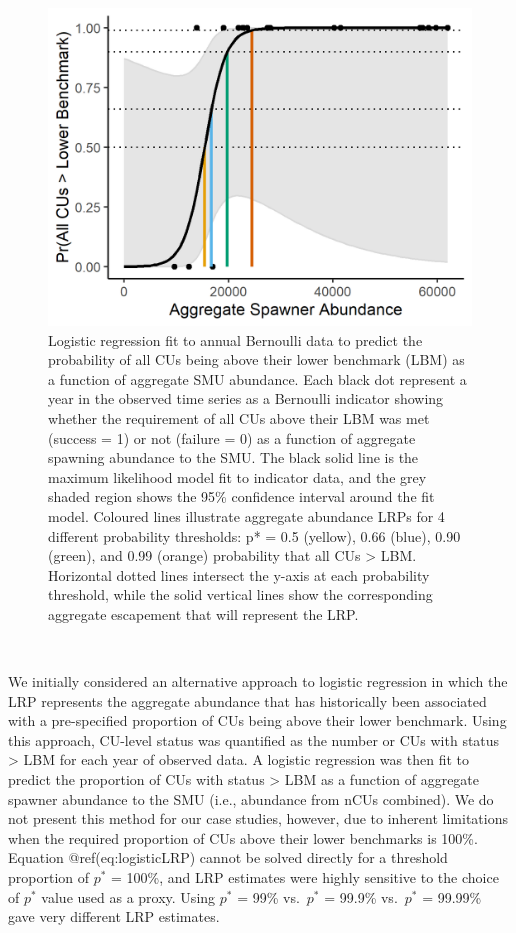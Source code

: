 \documentclass[
]{article}
\begin{document}
\begin{figure}

{\centering \includegraphics[width=0.6\linewidth]{figure/methods-Example-LogisticLRP} 

}

\caption{Logistic regression fit to annual Bernoulli data to predict the probability of all CUs being above their lower benchmark (LBM) as a function of aggregate SMU abundance. Each black dot represent a year in the observed time series as a Bernoulli indicator showing whether the requirement of all CUs above their LBM was met (success = 1) or not (failure = 0) as a function of aggregate spawning abundance to the SMU. The black solid line is the maximum likelihood model fit to indicator data, and the grey shaded region shows the 95\% confidence interval around the fit model. Coloured lines illustrate aggregate abundance LRPs for 4 different probability thresholds: p* = 0.5 (yellow), 0.66 (blue), 0.90 (green), and 0.99 (orange) probability that all CUs > LBM. Horizontal dotted lines intersect the y-axis at each probability threshold, while the solid vertical lines show the corresponding aggregate escapement that will represent the LRP.}\label{fig:example-logisticFit}
\end{figure}

~

We initially considered an alternative approach to logistic regression
in which the LRP represents the aggregate abundance that has
historically been associated with a pre-specified proportion of CUs
being above their lower benchmark. Using this approach, CU-level status
was quantified as the number or CUs with status \textgreater{} LBM for
each year of observed data. A logistic regression was then fit to
predict the proportion of CUs with status \textgreater{} LBM as a
function of aggregate spawner abundance to the SMU (i.e., abundance from
nCUs combined). We do not present this method for our case studies,
however, due to inherent limitations when the required proportion of CUs
above their lower benchmarks is 100\%. Equation @ref(eq:logisticLRP)
cannot be solved directly for a threshold proportion of \(p^*\) = 100\%,
and LRP estimates were highly sensitive to the choice of \(p^*\) value
used as a proxy. Using \(p^*\) = 99\% vs.~\(p^*\) = 99.9\% vs.~\(p^*\) =
99.99\% gave very different LRP estimates.
\end{document}

